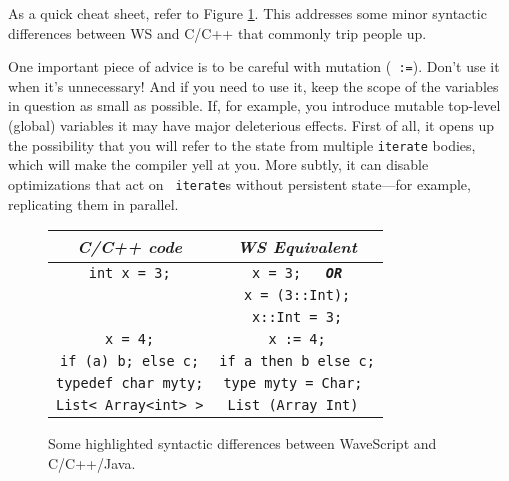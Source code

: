 \documentclass[twocolumn]{report}
\begin{document}
As a quick cheat sheet, refer to Figure \ref{f:cprogrammertips}.  This
addresses some minor syntactic differences between WS and C/C++ that
commonly trip people up.

One important piece of advice is to be careful with mutation ({\tt
  :=}).  Don't use it when it's unnecessary!  And if you need to use
  it, keep the scope of the variables in question as small as
  possible.  If, for example, you introduce mutable top-level (global)
  variables it may have major deleterious effects.  First of all, it
  opens up the possibility that you will refer to the state from
  multiple {\tt iterate} bodies, which will make the compiler yell at
  you.  More subtly, it can disable optimizations that act on {\tt
  iterate}s without persistent state---for example, replicating them
  in parallel.

\begin{figure}
\begin{center}
\begin{tabular}{|c|c|}
\hline {\em C/C++ code} & {\em WS Equivalent} \\
\hline
{\tt int x = 3;} & {\tt x = 3;     \ \ {\bf \em OR}}   \\
{\tt } & {\tt x = (3::Int);}  \\
{\tt } & {\tt x::Int = 3;}    \\
\hline
{\tt x = 4;}            & {\tt x := 4;} \\ 
\hline
{\tt if (a) b; else c;} & {\tt if a then b else c;} \\  \hline
{\tt typedef char myty;} & {\tt type myty = Char; } \\  \hline

{\tt List< Array<int> >}          & {\tt List (Array Int) } \\  \hline
\end{tabular}
\end{center}
\caption{Some highlighted syntactic differences between WaveScript and
  C/C++/Java.}
\label{f:cprogrammertips}
\end{figure}




\end{document}
